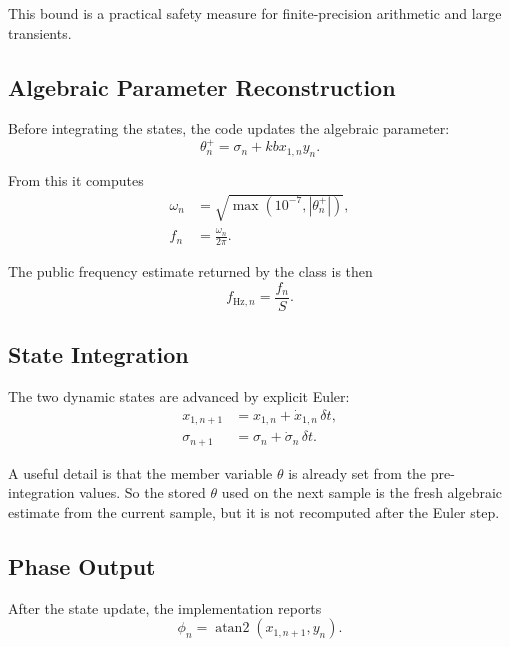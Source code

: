 \documentclass[conference]{IEEEtran}
\begin{document}
    This bound is a practical safety measure for finite-precision arithmetic and
    large transients.

    \subsection{Algebraic Parameter Reconstruction}

    Before integrating the states, the code updates the algebraic parameter:
    \begin{equation}
        \theta_n^{+} = \sigma_n + k b x_{1,n} y_n.
    \end{equation}

    From this it computes
    \begin{align}
        \omega_n &= \sqrt{\max\!\left(10^{-7}, |\theta_n^{+}|\right)},\\
        f_n &= \frac{\omega_n}{2\pi}.
    \end{align}

    The public frequency estimate returned by the class is then
    \begin{equation}
        f_{\text{Hz},n} = \frac{f_n}{S}.
    \end{equation}

    \subsection{State Integration}

    The two dynamic states are advanced by explicit Euler:
    \begin{align}
        x_{1,n+1} &= x_{1,n} + \dot{x}_{1,n}\,\delta t,\\
        \sigma_{n+1} &= \sigma_n + \dot{\sigma}_n\,\delta t.
    \end{align}

    A useful detail is that the member variable $\theta$ is already set from the
    pre-integration values. So the stored $\theta$ used on the next sample is the
    fresh algebraic estimate from the current sample, but it is not recomputed
    after the Euler step.

    \subsection{Phase Output}

    After the state update, the implementation reports
    \begin{equation}
        \phi_n = \operatorname{atan2}(x_{1,n+1}, y_n).
    \end{equation}
\end{document}
